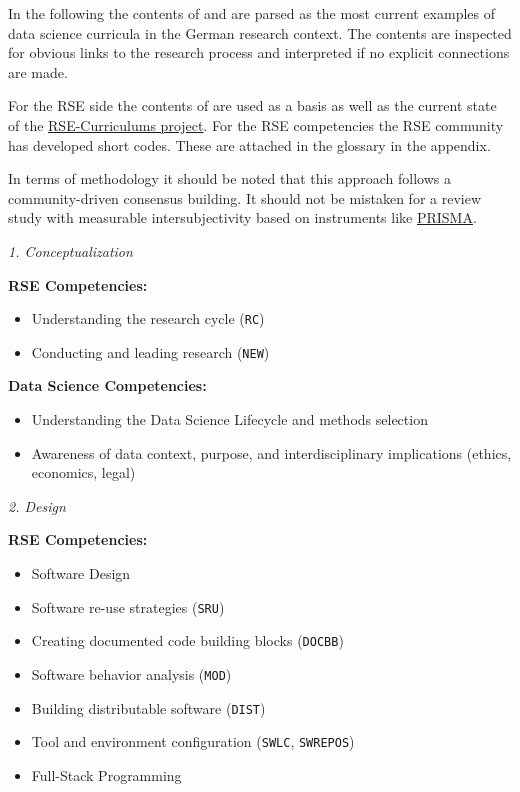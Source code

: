 \documentclass[
        english,biblatex
    ]{lni}
\providecommand{\tightlist}{%
    \setlength{\itemsep}{0pt}\setlength{\parskip}{0pt}}
\begin{document}
    In the following the contents of \autocite{GI2021DataScience} and
    \autocite{petersen_2025_15025246} are parsed as the most current
    examples of data science curricula in the German research context.
    The contents are inspected for obvious links to the research process
    and interpreted if no explicit connections are made.

    For the RSE side the contents of \autocite{Goth2024RSE} are used as
    a basis as well as the current state of the
    \href{https://github.com/juliandehne/RSE-Masters/blob/main/curriculum.md}{RSE-Curriculums
    project}. For the RSE competencies the RSE community has developed
    short codes. These are attached in the glossary in the appendix.

    In terms of methodology it should be noted that this approach
    follows a community-driven consensus building. It should not be
    mistaken for a review study with measurable intersubjectivity based
    on instruments like \href{https://www.prisma-statement.org}{PRISMA}.

    \emph{1. Conceptualization}

    \textbf{RSE Competencies:}

    \begin{itemize}
    \tightlist
    \item
      Understanding the research cycle (\texttt{RC})
    \item
      Conducting and leading research (\texttt{NEW})
    \end{itemize}

    \textbf{Data Science Competencies:}

    \begin{itemize}
    \tightlist
    \item
      Understanding the Data Science Lifecycle and methods selection
    \item
      Awareness of data context, purpose, and interdisciplinary
      implications (ethics, economics, legal)
    \end{itemize}

    \emph{2. Design}

    \textbf{RSE Competencies:}

    \begin{itemize}
    \tightlist
    \item
      Software Design
    \item
      Software re-use strategies (\texttt{SRU})
    \item
      Creating documented code building blocks (\texttt{DOCBB})
    \item
      Software behavior analysis (\texttt{MOD})
    \item
      Building distributable software (\texttt{DIST})
    \item
      Tool and environment configuration (\texttt{SWLC},
      \texttt{SWREPOS})
    \item
      Full-Stack Programming
    \end{itemize}
\end{document}
